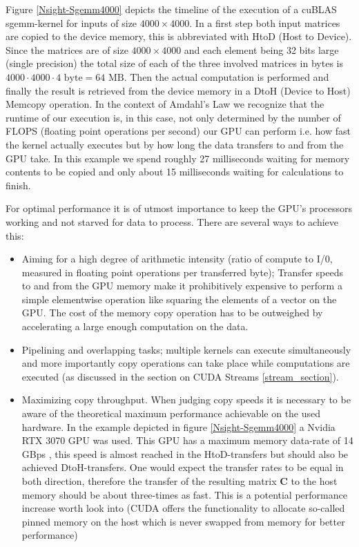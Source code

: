 \documentclass[english,11pt,a4paper,table]{article} %
\begin{document}
Figure \ref{Nsight-Sgemm4000} depicts the timeline of the execution of a cuBLAS sgemm-kernel for inputs of size $4000 \times 4000$. In a first step both input matrices are copied to the device memory, this is abbreviated with HtoD (Host to Device). Since the matrices are of size $4000 \times 4000$ and each element being 32 bits large (single precision) the total size of each of the three involved matrices in bytes is $4000 \cdot 4000 \cdot 4 \text{ byte} = 64 \text{ MB}$.
Then the actual computation is performed and finally the result is retrieved from the device memory in a DtoH (Device to Host) Memcopy operation.
In the context of Amdahl's Law we recognize that the runtime of our execution is, in this case, not only determined by the number of FLOPS (floating point operations per second) our GPU can perform i.e. how fast the kernel actually executes but by how long the data transfers to and from the GPU take.
In this example we spend roughly 27 milliseconds waiting for memory contents to be copied and only about 15 milliseconds waiting for calculations to finish.

For optimal performance it is of utmost importance to keep the GPU's processors working and not starved for data to process. There are several ways to achieve this:

\begin{itemize}
	\item Aiming for a high degree of arithmetic intensity (ratio of compute to I/0, measured in floating point operations per transferred byte); Transfer speeds to and from the GPU memory make it prohibitively expensive to perform a simple elementwise operation like squaring the elements of a vector on the GPU. The cost of the memory copy operation has to be outweighed by accelerating a large enough computation on the data.
	\item Pipelining and overlapping tasks; multiple kernels can execute simultaneously and more importantly copy operations can take place while computations are executed (as discussed in the section on CUDA Streams \ref{stream_section}).
	\item Maximizing copy throughput. When judging copy speeds it is necessary to be aware of the theoretical maximum performance achievable on the used hardware. In the example depicted in figure \ref{Nsight-Sgemm4000} a Nvidia RTX 3070 GPU was used.
	This GPU has a maximum memory data-rate of 14 GBps \cite{NVIDIAam19:online}, this speed is almost reached in the HtoD-transfers but should also be achieved DtoH-transfers. One would expect the transfer rates to be equal in both direction, therefore the transfer of the resulting matrix $\mathbf{C}$ to the host memory should be about three-times as fast. This is a potential performance increase worth look into (CUDA offers the functionality to allocate so-called pinned memory on the host which is never swapped from memory for better performance)
\end{itemize}
\end{document}
